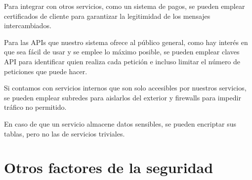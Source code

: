 \documentclass[11pt,a4paper]{article}
\begin{document}
Para integrar con otros servicios, como un sistema de pagos, se pueden emplear certificados de cliente para garantizar la legitimidad de los mensajes intercambiados.

Para las APIs que nuestro sistema ofrece al público general, como hay interés en que sea fácil de usar y se emplee lo máximo posible, se pueden emplear claves API para identificar quien realiza cada petición e incluso limitar el número de peticiones que puede hacer.

Si contamos con servicios internos que son solo accesibles por nuestros servicios, se pueden emplear subredes para aislarlos del exterior y firewalls para impedir tráfico no permitido. 

En caso de que un servicio almacene datos sensibles, se pueden encriptar sus tablas, pero no las de servicios triviales.

\section{Otros factores de la seguridad}
\end{document}
